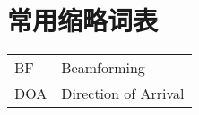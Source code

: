\chapter{常用缩略词表}
\begin{center}
	\begin{tabular}{ll}
		BF  & Beamforming          \\
		DOA & Direction of Arrival \\
	\end{tabular}
\end{center}
